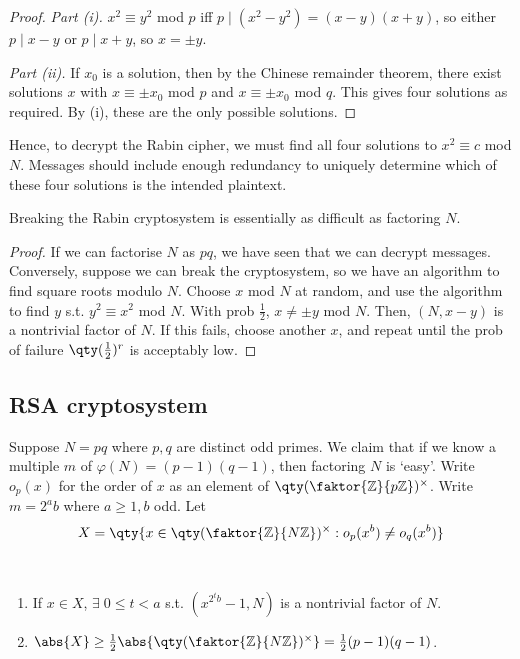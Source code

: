 \begin{proof}
    \emph{Part (i).}
    $x^2 \equiv y^2$ mod $p$ iff $p \mid (x^2 - y^2) = (x-y)(x+y)$, so either $p \mid x-y$ or $p \mid x+y$, so $x = \pm y$.

    \emph{Part (ii).}
    If $x_0$ is a solution, then by the Chinese remainder theorem, there exist solutions $x$ with $x \equiv \pm x_0$ mod $p$ and $x \equiv \pm x_0$ mod $q$.
    This gives four solutions as required.
    By (i), these are the only possible solutions.
\end{proof}

Hence, to decrypt the Rabin cipher, we must find all four solutions to $x^2 \equiv c$ mod $N$.
Messages should include enough redundancy to uniquely determine which of these four solutions is the intended plaintext.

\begin{theorem}
    Breaking the Rabin cryptosystem is essentially as difficult as factoring $N$.
\end{theorem}

\begin{proof}
    If we can factorise $N$ as $pq$, we have seen that we can decrypt messages.
    Conversely, suppose we can break the cryptosystem, so we have an algorithm to find square roots modulo $N$.
    Choose $x$ mod $N$ at random, and use the algorithm to find $y$ s.t. $y^2 \equiv x^2$ mod $N$.
    With prob $\frac{1}{2}$, $x \neq \pm y$ mod $N$.
    Then, $(N, x-y)$ is a nontrivial factor of $N$.
    If this fails, choose another $x$, and repeat until the prob of failure $\qty(\frac{1}{2})^r$ is acceptably low.
\end{proof}

\subsection{RSA cryptosystem}
Suppose $N = pq$ where $p, q$ are distinct odd primes.
We claim that if we know a multiple $m$ of $\varphi(N) = (p-1)(q-1)$, then factoring $N$ is `easy'.
Write $o_p(x)$ for the order of $x$ as an element of $\qty(\faktor{\mathbb Z}{p\mathbb Z})^\times$.
Write $m = 2^a b$ where $a \geq 1, b$ odd.
Let
\begin{align*}
    X = \qty{x \in \qty(\faktor{\mathbb Z}{N\mathbb Z})^\times : o_p(x^b) \neq o_q(x^b)}
\end{align*}

\begin{theorem} ~\vspace*{-1.5\baselineskip}
    \begin{enumerate}
        \item If $x \in X$, $\exists \; 0 \leq t < a$ s.t. $(x^{2^t b} - 1, N)$ is a nontrivial factor of $N$.
        \item $\abs{X} \geq \frac{1}{2} \abs{\qty(\faktor{\mathbb Z}{N\mathbb Z})^\times} = \frac{1}{2}(p-1)(q-1)$.
    \end{enumerate}
\end{theorem}

